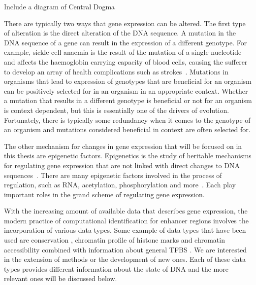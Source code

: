         \begin{center}
            Include a diagram of Central Dogma
        \end{center}
        
        There are typically two ways that gene expression can be altered.
        The first type of alteration is the direct alteration of the DNA sequence. A mutation in the DNA sequence of a gene can result in the expression of a different genotype.        %
        For example, sickle cell anaemia is the result of the mutation of a single nucleotide and affects the haemoglobin carrying capacity of blood cells, causing the sufferer to develop an array of health complications such as strokes~\cite{clancy2008dna}. 
        Mutations in organisms that lead to expression of genotypes that are beneficial for an organism can be positively selected for in an organism in an appropriate context. Whether a mutation that results in a different genotype is beneficial or not for an organism is context dependent, but this is essentially one of the drivers of evolution. Fortunately, there is typically some redundancy when it comes to the genotype of an organism and mutations considered beneficial in context are often selected for.
        
        The other mechanism for changes in gene expression that will be focused on in this thesis are epigenetic factors. Epigenetics is the study of heritable mechanisms for regulating gene expression that are not linked with direct changes to DNA sequences~\cite{holliday2006epigenetics}. There are many epigenetic factors involved in the process of regulation, such as RNA, acetylation, phosphorylation and more~\cite{geiman2002chromatin, jaenisch2003epigenetic, holoch2015rna, waterland2003transposable}. Each play important roles in the grand scheme of regulating gene expression. 
        
        With the increasing amount of available data that describes gene expression, the modern practice of computational identification for enhancer regions involves the incorporation of various data types. Some example of data types that have been used are conservation \cite{visel2007enhancer}, chromatin profile of histone marks \cite{won2010genome} and chromatin accessibility combined with information about general TFBS \cite{boyle2010high}. We are interested in the extension of methods or the development of new ones. Each of these data types provides different information about the state of DNA and the more relevant ones will be discussed below. 
        
